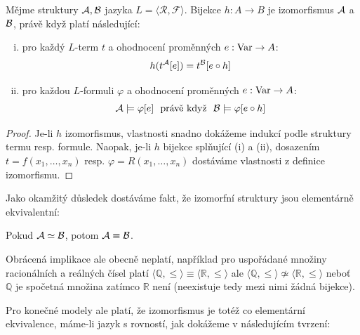\begin{proposition}\label{proposition:isomorphism-preserves-semantics}
Mějme struktury $\mathcal{A},\mathcal{B}$ jazyka $L=\langle\mathcal R,\mathcal F\rangle$. Bijekce $h\colon A\to B$ je izomorfismus $\mathcal{A}$ a $\mathcal{B}$, právě když platí následující:
\begin{enumerate}[(i)]
    \item pro každý $L$-term $t$ a ohodnocení proměnných $e:\operatorname{Var}\to A$:
    $$
    h(t^{\mathcal{A}}[e])=t^{\mathcal{B}}[e\circ h]
    $$
    \item pro každou $L$-formuli $\varphi$ a ohodnocení proměnných $e:\operatorname{Var}\to A$:
    $$
    \A\models \varphi[e]\ \text{ právě když }\ \B\models\varphi[e\circ h]
    $$
\end{enumerate}
\end{proposition}
\begin{proof}
    Je-li $h$ izomorfismus, vlastnosti snadno dokážeme indukcí podle struktury termu resp. formule. Naopak, je-li $h$ bijekce splňující (i) a (ii), dosazením $t=f(x_1,\dots,x_n)$ resp. $\varphi=R(x_1,\dots,x_n)$ dostáváme vlastnosti z definice izomorfismu.
\end{proof}

Jako okamžitý důsledek dostáváme fakt, že izomorfní struktury jsou elementárně ekvivalentní:

\begin{corollary}\label{corollary:isomorphic-implies-elementarily-equivalent}
    Pokud $\mathcal{A}\simeq\mathcal{B}$, potom $\mathcal{A}\equiv\mathcal{B}$.
\end{corollary}

\begin{remark}
    Obrácená implikace ale obecně neplatí, například pro uspořádané množiny racionálních a reálných čísel platí $\langle\mathbb Q,\leq \rangle\equiv\langle\mathbb R,\leq\rangle$ ale $\langle\mathbb Q,\leq \rangle\not\simeq \langle \mathbb R,\leq\rangle$ neboť $\mathbb Q$ je spočetná množina zatímco $\mathbb R$ není (neexistuje tedy mezi nimi žádná bijekce).
\end{remark}

Pro konečné modely ale platí, že izomorfismus je totéž co elementární ekvivalence, máme-li jazyk s rovností, jak dokážeme v následujícím tvrzení:

